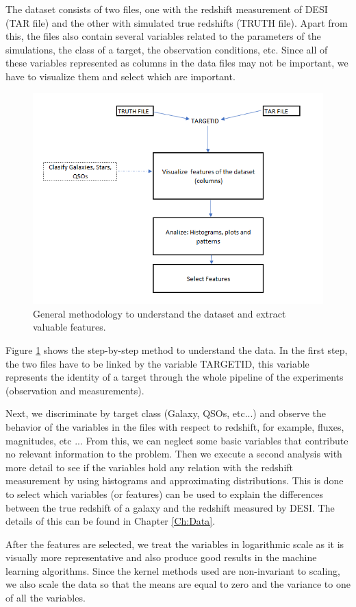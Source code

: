 The dataset consists of two files, one with the redshift measurement of DESI (TAR file) and the other with simulated true redshifts (TRUTH file). Apart from this, the files also contain several variables related to the parameters of the simulations, the class of a target, the observation conditions, etc. Since all of these variables represented as columns in the data files may not be important, we have to visualize them and select which are important. 
\begin{figure}[h!]
	\centering
	\includegraphics[width=0.8\linewidth]{TeX_files/Imagenes/metho_1}
	\caption{General methodology to understand the dataset and extract valuable features.}
	\label{fig:metho1}
\end{figure}

Figure \ref{fig:metho1} shows the step-by-step method to understand the data. In the first step, the two files have to be linked by the variable TARGETID, this variable represents the identity of a target through the whole pipeline of the experiments (observation and measurements). 

Next, we discriminate by target class (Galaxy, QSOs, etc...) and observe the behavior of the variables in the files with respect to redshift, for example, fluxes, magnitudes, etc ... From this, we can neglect some basic variables that contribute no relevant information to the problem. Then we execute a second analysis with more detail to see if the variables hold any relation with the redshift measurement by using histograms and approximating distributions. This is done to select which variables (or features) can be used to explain the differences between the true redshift of a galaxy and the redshift measured by DESI. The details of this can be found in Chapter \ref{Ch:Data}. 

After the features are selected,  we treat the variables in logarithmic scale as it is visually more representative and also produce good results in the machine learning algorithms. Since the kernel methods used are non-invariant to scaling, we also scale the data so that the means are equal to zero and the variance to one of all the variables.
